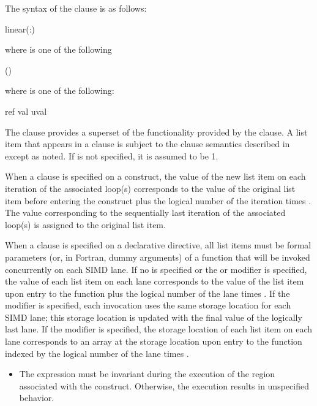 {{{{\fortranspecificstart
The syntax of the  clause is as follows:
\begin{boxedcode}
linear(\plc{linear-list[ }:\plc{ linear-step]})
\end{boxedcode}
where  is one of the following
\begin{indentedcodelist}
()
\end{indentedcodelist}
where   is one of the following:
\begin{indentedcodelist}
ref
val
uval
\end{indentedcodelist}
\fortranspecificend


\descr
The  clause provides a superset of the functionality provided by the  clause.
A list item that appears in a  clause is subject to the  clause semantics described
in  except as noted.
If  is not specified, it is assumed to be 1.

When a  clause is specified on a construct, the value of the new list item on each iteration of the associated loop(s) corresponds to the value of the original list item before entering the construct plus the logical number of the iteration times . 
The value corresponding to the sequentially last iteration of the associated loop(s) is assigned to the original list item.

When a  clause is specified on a declarative directive, all list items must be formal parameters (or, in Fortran, dummy arguments) of a function that will be invoked concurrently on each SIMD lane.
If no  is specified or the  or  modifier is specified, the value of each list item on each lane corresponds to the value of the list item upon entry to the function plus the logical number of the lane times .
If the  modifier is specified, each invocation uses the same storage location for each SIMD lane; this storage location is updated with the final value of the logically last lane.
If the  modifier is specified, the storage location of each list item on each lane corresponds to an array at the storage location upon entry to the function indexed by the logical number of the lane times .


\restrictions
\begin{itemize}
\item The  expression must be invariant during the execution of the region 
associated with the construct. Otherwise, the execution results in unspecified 
behavior.


\end{itemize}}}}}
